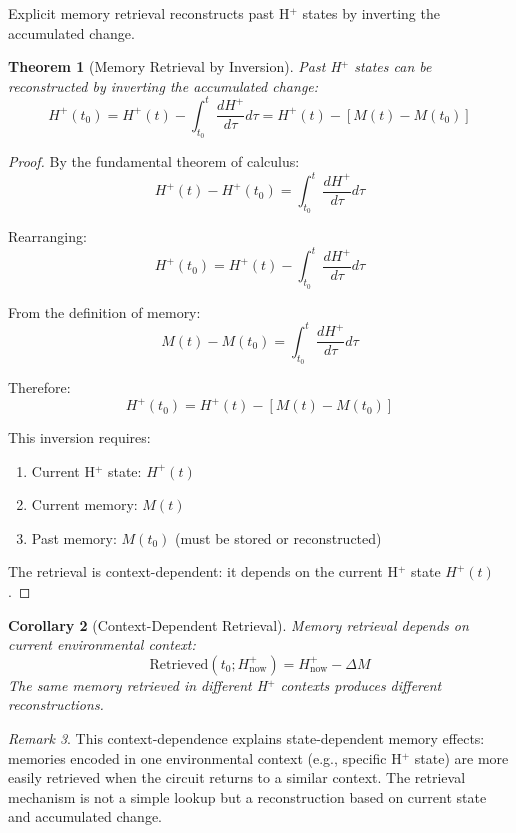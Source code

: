 \documentclass[aps,prd,twocolumn,superscriptaddress,floatfix,nofootinbib]{revtex4-2}
\newtheorem{theorem}{Theorem}[section]
\newtheorem{corollary}[theorem]{Corollary}
\theoremstyle{remark}
\newtheorem{remark}[theorem]{Remark}
\begin{document}
Explicit memory retrieval reconstructs past H$^+$ states by inverting the accumulated change.

\begin{theorem}[Memory Retrieval by Inversion]
\label{thm:memory_retrieval}
Past H$^+$ states can be reconstructed by inverting the accumulated change:
\begin{equation}
H^+(t_0) = H^+(t) - \int_{t_0}^{t} \frac{dH^+}{d\tau} d\tau = H^+(t) - [M(t) - M(t_0)]
\end{equation}
\end{theorem}

\begin{proof}
By the fundamental theorem of calculus:
$$
H^+(t) - H^+(t_0) = \int_{t_0}^{t} \frac{dH^+}{d\tau} d\tau
$$

Rearranging:
$$
H^+(t_0) = H^+(t) - \int_{t_0}^{t} \frac{dH^+}{d\tau} d\tau
$$

From the definition of memory:
$$
M(t) - M(t_0) = \int_{t_0}^{t} \frac{dH^+}{d\tau} d\tau
$$

Therefore:
$$
H^+(t_0) = H^+(t) - [M(t) - M(t_0)]
$$

This inversion requires:
\begin{enumerate}
\item Current H$^+$ state: $H^+(t)$
\item Current memory: $M(t)$
\item Past memory: $M(t_0)$ (must be stored or reconstructed)
\end{enumerate}

The retrieval is context-dependent: it depends on the current H$^+$ state $H^+(t)$.
\end{proof}

\begin{corollary}[Context-Dependent Retrieval]
\label{cor:context_retrieval}
Memory retrieval depends on current environmental context:
\begin{equation}
\text{Retrieved}(t_0; H^+_{\text{now}}) = H^+_{\text{now}} - \Delta M
\end{equation}
The same memory retrieved in different H$^+$ contexts produces different reconstructions.
\end{corollary}

\begin{remark}
This context-dependence explains state-dependent memory effects: memories encoded in one environmental context (e.g., specific H$^+$ state) are more easily retrieved when the circuit returns to a similar context. The retrieval mechanism is not a simple lookup but a reconstruction based on current state and accumulated change.
\end{remark}
\end{document}
